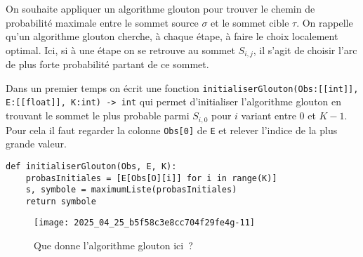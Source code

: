 
On souhaite appliquer un algorithme glouton pour trouver le chemin de probabilité maximale entre le sommet source $\sigma$ et le sommet cible $\tau$. On rappelle qu'un algorithme glouton cherche, à chaque étape, à faire le choix localement optimal. Ici, si à une étape on se retrouve au sommet $S_{i, j}$, il s'agit de choisir l'arc de plus forte probabilité partant de ce sommet.

Dans un premier temps on écrit une fonction
\lstinline{initialiserGlouton(Obs:[[int]], E:[[float]], K:int) -> int} qui permet d'initialiser l'algorithme glouton en trouvant le sommet le plus probable parmi $S_{i, 0}$ pour $i$ variant entre 0 et $K-1$. Pour cela il faut regarder la colonne \lstinline{Obs[0]} de \lstinline{E} et relever l'indice de la plus grande valeur.

\begin{lstlisting}
def initialiserGlouton(Obs, E, K):
    probasInitiales = [E[Obs[O][i]] for i in range(K)]
    s, symbole = maximumListe(probasInitiales)
    return symbole
\end{lstlisting}






\begin{figure}
\centering
\texttt{[image: 2025\_04\_25\_b5f58c3e8cc704f29fe4g-11]}
\caption{Que donne l'algorithme glouton ici~? \label{fig_ccmp_2024_info_04}}
\end{figure}




